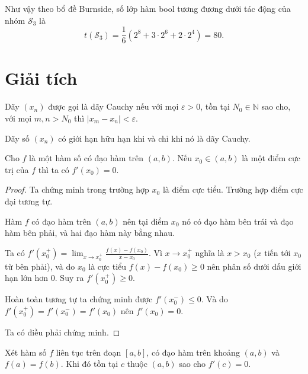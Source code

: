 \documentclass{mynotes}
\newcommand{\NN}{\mathbb{N}}
\begin{document}
Như vậy theo bổ đề Burnside, số lớp hàm bool tương đương dưới tác động của nhóm $\mathcal{S}_3$ là \[ t (\mathcal{S}_3) = \dfrac{1}{6}(2^8 + 3 \cdot 2^6 + 2 \cdot 2^4) = 80. \]

\chapter{Giải tích}

\begin{definition}
    Dãy $(x_n)$ được gọi là dãy Cauchy nếu với mọi $\varepsilon > 0$, tồn tại $N_0 \in \NN$ sao cho, với mọi $m, n > N_0$ thì $\lvert x_m - x_n \rvert < \varepsilon$.
\end{definition}

\begin{theorem}
    Dãy số $(x_n)$ có giới hạn hữu hạn khi và chỉ khi nó là dãy Cauchy.
\end{theorem}

\begin{theorem}[Bổ đề Fermat]
    Cho $f$ là một hàm số có đạo hàm trên $(a, b)$. Nếu $x_0 \in (a, b)$ là một điểm cực trị của $f$ thì ta có $f'(x_0) = 0$.
\end{theorem}

\begin{proof}
    Ta chứng minh trong trường hợp $x_0$ là điểm cực tiểu. Trường hợp điểm cực đại tương tự.

    Hàm $f$ có đạo hàm trên $(a, b)$ nên tại điểm $x_0$ nó có đạo hàm bên trái và đạo hàm bên phải, và hai đạo hàm này bằng nhau.

    Ta có $\displaystyle{f'(x_0^+) = \lim_{x \to x_0^+} \frac{f(x) - f(x_0)}{x - x_0}}$. Vì $x \to x_0^+$ nghĩa là $x > x_0$ ($x$ tiến tới $x_0$ từ bên phải), và do $x_0$ là cực tiểu $f(x) - f(x_0) \geqslant 0$ nên phân số dưới dấu giới hạn lớn hơn 0. Suy ra $f'(x_0^+) \geqslant 0$.

    Hoàn toàn tương tự ta chứng minh được $f'(x_0^-) \leqslant 0$. Và do $f'(x_0^+) = f'(x_0^-) = f'(x_0)$ nên $f'(x_0) = 0$.

    Ta có điều phải chứng minh.
\end{proof}

\begin{theorem}
    Xét hàm số $f$ liên tục trên đoạn $[a, b]$, có đạo hàm trên khoảng $(a, b)$ và $f(a) = f(b)$. Khi đó tồn tại $c$ thuộc $(a, b)$ sao cho $f'(c) = 0$.
\end{theorem}
\end{document}
